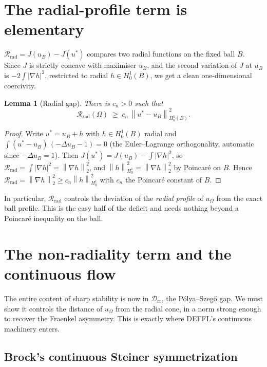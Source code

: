 \documentclass[11pt]{article}
\newtheorem{lemma}[theorem]{Lemma}
\theoremstyle{definition}
\newcommand{\Om}{\Omega}
\newcommand{\Drr}{\mathcal D_{\mathrm{rr}}}
\newcommand{\Rrad}{\mathcal R_{\mathrm{rad}}}
\newcommand{\norm}[1]{\left\|#1\right\|}
\begin{document}
\section{The radial-profile term is elementary}
\label{sec:radial}

$\Rrad=J(u_B)-J(u^*)$ compares two radial functions on the fixed ball $B$.
Since $J$ is strictly concave with maximiser $u_B$, and the second variation
of $J$ at $u_B$ is $-2\int|\nabla h|^2$, restricted to radial $h\in
H^1_0(B)$, we get a clean one-dimensional coercivity.

\begin{lemma}[Radial gap]\label{lem:radial}
There is $c_n>0$ such that
\[
   \Rrad(\Om)\;\ge\;c_n\,\norm{u^*-u_B}_{H^1_0(B)}^2 .
\]
\end{lemma}

\begin{proof}
Write $u^*=u_B+h$ with $h\in H^1_0(B)$ radial and $\int(u^*-u_B)\,(-\Delta u_B-1)=0$
(the Euler--Lagrange orthogonality, automatic since $-\Delta u_B=1$). Then
$J(u^*)=J(u_B)-\int|\nabla h|^2$, so $\Rrad=\int|\nabla h|^2=\norm{\nabla h}_2^2$,
and $\norm{h}_{H^1_0}^2=\norm{\nabla h}_2^2$ by Poincaré on $B$. Hence
$\Rrad=\norm{\nabla h}_2^2\ge c_n\norm{h}_{H^1_0}^2$ with $c_n$ the Poincaré
constant of $B$.
\end{proof}

In particular, $\Rrad$ controls the deviation of the \emph{radial profile} of
$u_\Om$ from the exact ball profile. This is the easy half of the deficit and
needs nothing beyond a Poincaré inequality on the ball.

\section{The non-radiality term and the continuous flow}
\label{sec:dissipation}

The entire content of sharp stability is now in $\Drr$, the Pólya--Szegő gap.
We must show it controls the distance of $u_\Om$ from the radial cone, in a
norm strong enough to recover the Fraenkel asymmetry. This is exactly where
DEFFL's continuous machinery enters.

\subsection{Brock's continuous Steiner symmetrization}
\end{document}
